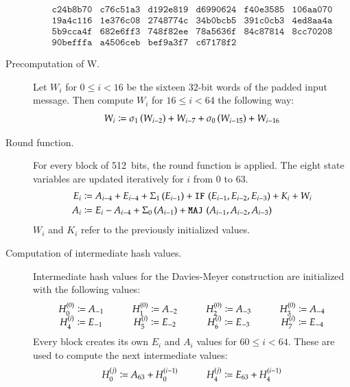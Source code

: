 \begin{description}
\[\begin{array}{cccccc}
        \texttt{c24b8b70} & \texttt{c76c51a3} & \texttt{d192e819} & \texttt{d6990624} & \texttt{f40e3585} & \texttt{106aa070} \\
        \texttt{19a4c116} & \texttt{1e376c08} & \texttt{2748774c} & \texttt{34b0bcb5} & \texttt{391c0cb3} & \texttt{4ed8aa4a} \\
        \texttt{5b9cca4f} & \texttt{682e6ff3} & \texttt{748f82ee} & \texttt{78a5636f} & \texttt{84c87814} & \texttt{8cc70208} \\
        \texttt{90befffa} & \texttt{a4506ceb} & \texttt{bef9a3f7} & \texttt{c67178f2}
      \end{array}
    \]
  \item[Precomputation of W.]
    Let $W_i$ for $0 \leq i < 16$ be the sixteen 32-bit words of the padded input message.
    Then compute $W_i$ for $16 \leq i < 64$ the following way:
    \[ W_i \coloneqq \operatorname{\sigma_1\,}(W_{i-2}) + W_{i-7} + \operatorname{\sigma_0\,}(W_{i-15}) + W_{i-16} \]
  \item[Round function.]
    For every block of 512~bits, the round function is applied.
    The eight state variables are updated iteratively for $i$ from 0 to 63.
    \begin{align*}
      E_i     &\coloneqq A_{i-4} + E_{i-4} + \operatorname{\Sigma_1\,}(E_{i-1}) + \operatorname{\texttt{IF\,}}{(E_{i-1}, E_{i-2}, E_{i-3})} + K_i + W_i \\
      A_i     &\coloneqq E_i - A_{i-4} + \operatorname{\Sigma_0\,}(A_{i-1}) + \operatorname{\texttt{MAJ\,}}{(A_{i-1}, A_{i-2}, A_{i-3})}
    \end{align*}
    $W_i$ and $K_i$ refer to the previously initialized values.
  \item[Computation of intermediate hash values.]
    Intermediate hash values for the Davies-Meyer construction are
    initialized with the following values:
    \[
      \begin{array}{cp{10pt}cp{10pt}cp{10pt}c}
        H_0^{(0)} \coloneqq A_{-1}  & &  H_1^{(0)} \coloneqq A_{-2}  & &  H_2^{(0)} \coloneqq A_{-3}  & &  H_3^{(0)} \coloneqq A_{-4} \\
        H_4^{(i)} \coloneqq E_{-1}  & &  H_5^{(i)} \coloneqq E_{-2}  & &  H_6^{(i)} \coloneqq E_{-3}  & &  H_7^{(i)} \coloneqq E_{-4} \\
      \end{array}
    \]
    Every block creates its own $E_{i}$ and $A_{i}$ values for $60 \leq i < 64$.
    These are used to compute the next intermediate values:
    \[
      \begin{array}{lp{10pt}r}
        H_0^{(j)} \coloneqq A_{63} + H_0^{(i-1)}  & &  H_4^{(j)} \coloneqq E_{63} + H_4^{(i-1)} \\

\end{array}\]
\end{description}
